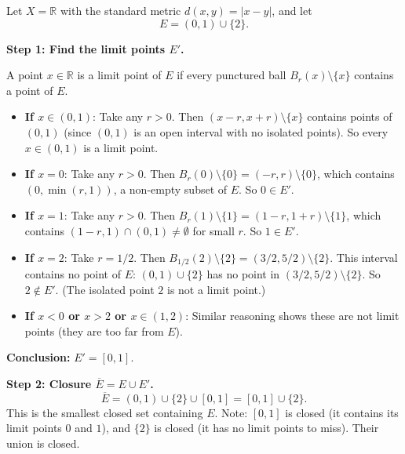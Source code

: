 \begin{example}[Computing $E'$, $\overline{E}$, $\partial E$, $\operatorname{int}(E)$,
$\operatorname{ext}(E)$ for $E = (0,1) \cup \{2\}$ in $\mathbb{R}$]
\label{ex:derived-set-full-computation}

Let $X = \mathbb{R}$ with the standard metric $d(x,y) = |x - y|$,
and let
\[
E = (0,1) \cup \{2\}.
\]

\medskip
\noindent\textbf{Step 1: Find the limit points $E'$.}

A point $x \in \mathbb{R}$ is a limit point of $E$ if every punctured
ball $B_r(x) \setminus \{x\}$ contains a point of $E$.

\begin{itemize}
  \item \textbf{If $x \in (0,1)$}: Take any $r > 0$.
        Then $(x - r, x + r) \setminus \{x\}$ contains points of $(0,1)$
        (since $(0,1)$ is an open interval with no isolated points).
        So every $x \in (0,1)$ is a limit point.

  \item \textbf{If $x = 0$}: Take any $r > 0$.
        Then $B_r(0) \setminus \{0\} = (-r, r) \setminus \{0\}$,
        which contains $(0, \min(r,1))$, a non-empty subset of $E$.
        So $0 \in E'$.

  \item \textbf{If $x = 1$}: Take any $r > 0$.
        Then $B_r(1) \setminus \{1\} = (1-r, 1+r) \setminus \{1\}$,
        which contains $(1-r, 1) \cap (0,1) \neq \emptyset$ for small $r$.
        So $1 \in E'$.

  \item \textbf{If $x = 2$}: Take $r = 1/2$.
        Then $B_{1/2}(2) \setminus \{2\} = (3/2, 5/2) \setminus \{2\}$.
        This interval contains no point of $E$:
        $(0,1) \cup \{2\}$ has no point in $(3/2, 5/2) \setminus \{2\}$.
        So $2 \notin E'$. \quad (The isolated point $2$ is not a limit point.)

  \item \textbf{If $x < 0$ or $x > 2$ or $x \in (1,2)$}: Similar reasoning shows these
        are not limit points (they are too far from $E$).
\end{itemize}

\noindent\textbf{Conclusion:} $E' = [0, 1]$.

\medskip
\noindent\textbf{Step 2: Closure $\overline{E} = E \cup E'$.}
\[
\overline{E} = (0,1) \cup \{2\} \cup [0,1] = [0,1] \cup \{2\}.
\]
This is the smallest closed set containing $E$.
Note: $[0,1]$ is closed (it contains its limit points $0$ and $1$),
and $\{2\}$ is closed (it has no limit points to miss).
Their union is closed.


\end{example}
